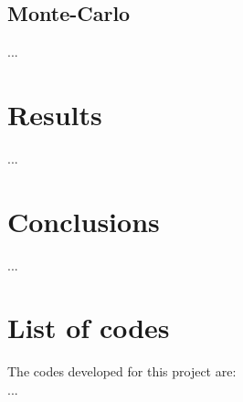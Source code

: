 \documentclass{article}
\begin{document}
\begin{multicols}{2}
\subsection{Monte-Carlo}
...


\section{Results}
...



\section{Conclusions}
...





\section{List of codes}

The codes developed for this project are:\\
...

\end{multicols}
\end{document}

